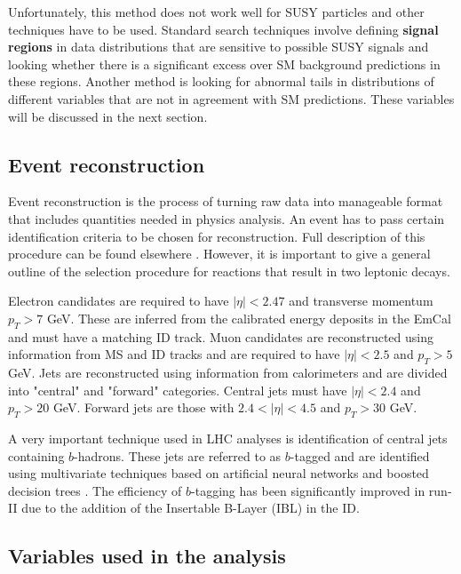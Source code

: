 Unfortunately, this method does not work well for SUSY particles and other techniques have to be used. Standard search techniques involve defining \textbf{signal regions} in data distributions that are sensitive to possible SUSY signals and looking whether there is a significant excess over SM background predictions in these regions. Another method is looking for abnormal tails in distributions of different variables that are not in agreement with SM predictions. These variables will be discussed in the next section.

\subsection{Event reconstruction}

Event reconstruction is the process of turning raw data into manageable format that includes quantities needed in physics analysis. An event has to pass certain identification criteria to be chosen for reconstruction. 
Full description of this procedure can be found elsewhere \citep{atlas2015search}. However, it is important to give a general outline of the selection procedure for reactions that result in two leptonic decays.

Electron candidates are required to have $|\eta|<2.47$ and transverse momentum $p_{T}>7$ GeV. These are inferred from the calibrated  energy deposits in the EmCal and must have a matching ID track. Muon candidates are reconstructed using information from MS and ID tracks and are required to have   $|\eta|<2.5$ and $p_{T}>5$ GeV. Jets are reconstructed using information from calorimeters and are divided into "central" and "forward" categories. Central jets must have $|\eta|<2.4$ and $p_{T}>20$ GeV. Forward jets are those with $2.4<|\eta|<4.5$ and $p_{T}>30$ GeV. 

A very important technique used in LHC analyses is identification of central jets containing $b$-hadrons. These jets are referred to as $b$-tagged and are identified using multivariate techniques based on artificial neural networks and boosted decision trees \citep{Aad:2015ydr}. The efficiency of $b$-tagging has been significantly improved in run-II due to the addition of the Insertable B-Layer (IBL) in the ID.


\subsection{Variables used in the analysis}





 
